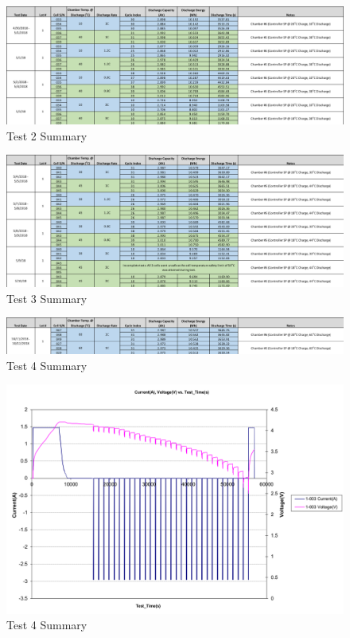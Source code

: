 \documentclass[]{aiaa-tc}%
\begin{document}
\begin{figure}[!htb]
	\centering
	\includegraphics[width=1.0\textwidth]{figures/Test2Summary.png}
	\caption{Test 2 Summary}
	\label{fig:Test2Summary}
\end{figure}

\begin{figure}[!htb]
	\centering
	\includegraphics[width=1.0\textwidth]{figures/Test3Summary.png}
	\caption{Test 3 Summary}
	\label{fig:Test3Summary}
\end{figure}

\begin{figure}[!htb]
	\centering
	\includegraphics[width=1.0\textwidth]{figures/Test4Summary.png}
	\caption{Test 4 Summary}
	\label{fig:Test4Summary}
\end{figure}

\begin{figure}[!htb]
	\centering
	\includegraphics[width=1.0\textwidth]{figures/SampleTest.png}
	\caption{Test 4 Summary}
	\label{fig:Test4Summary}
\end{figure}
\end{document}
